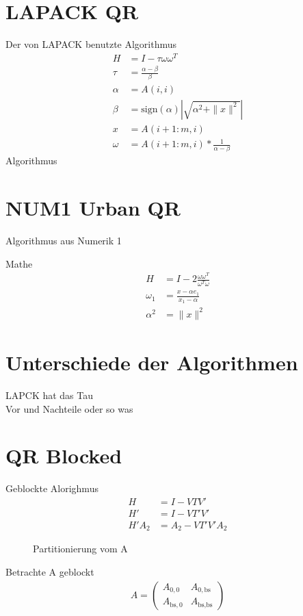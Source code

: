 \section{LAPACK QR}
Der von LAPACK benutzte Algorithmus \cite{DGEQR2}
\begin{align}
	H &= I - \tau \omega \omega^T \\
	\tau &= \frac{\alpha - \beta}{\beta} \\
	\alpha &= A(i,i)\\
	\beta &= \text{sign}(\alpha) \left|\sqrt{\alpha^2 + \|x\|^2}\right|\\
	x &= A(i+1:m,i)\\
	\omega &= A(i+1:m,i) * \frac{1}{\alpha - \beta}
\end{align}
Algorithmus

\section{NUM1 Urban QR}
Algorithmus aus Numerik 1

Mathe
\begin{align}
	H &= I - 2 \frac{\omega \omega^T}{\omega^T \omega}\\
	\omega_1 &= \frac{x - \alpha e_1}{x_1 - \alpha}\\
	\alpha ^2 &= \|x\|^2 
\end{align}


\section{Unterschiede der Algorithmen}
LAPCK hat das Tau \\
Vor und Nachteile oder so was

\section{QR Blocked}
Geblockte Alorighmus
\begin{align}
H &= I - VTV'\\
H' &= I - VT'V'\\ 
H'A_2 &= A_2 - VT'V'A_2
\end{align}

\begin{figure} 
	\centering
	
	\caption{Partitionierung vom A}
	\label{fig:patrA}
\end{figure}





Betrachte A geblockt
\begin{align}
	A = \left(\begin{array}{l|l}
	A_{0, 0} & A_{0, \text{bs}} \\ \hline
	A_{\text{bs}, 0}   & A_{\text{bs}, \text{bs}} 	
	\end{array} \right) 
\end{align}


